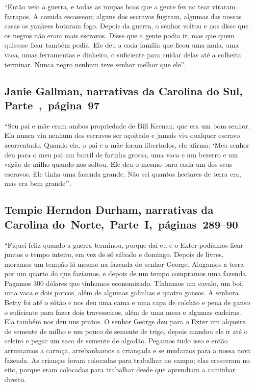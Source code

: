 ``Então veio a guerra, e todas as roupas boas que a gente fez no tear
viraram farrapos. A comida escasseou; alguns dos escravos fugiram,
algumas das nossas casas os yankees botaram fogo. Depois da guerra, o
senhor voltou e nos disse que os negros não eram mais escravos. Disse
que a gente podia ir, mas que quem quisesse ficar também podia. Ele deu
a cada família que ficou uma mula, uma vaca, umas ferramentas e
dinheiro, o suficiente para cuidar delas até a colheita terminar. Nunca
negro nenhum teve senhor melhor que ele''.

\subsection{Janie Gallman, narrativas da Carolina do Sul, Parte~,~página~97}
\label{ref97} 

``Seu pai e mãe eram ambos propriedade de Bill Keenan, que era um bom
senhor. Ela nunca viu nenhum dos escravos ser açoitado e jamais viu
qualquer escravo acorrentado. Quando ela, o pai e a mãe foram
libertados, ela afirma: `Meu senhor deu para o meu pai um barril de
farinha grossa, uma vaca e um bezerro e um vagão de milho quando nos
soltou. Ele deu o mesmo para cada um dos seus escravos. Ele tinha uma
fazenda grande. Não sei quantos hectares de terra era, mas era bem
grande'".

\subsection{Tempie Herndon Durham, narrativas da Carolina do~Norte,~Parte~I,~páginas~289--90}
\label{ref77}

``Fiquei feliz quando a guerra terminou, porque daí eu e o Exter
podíamos ficar juntos o tempo inteiro, em vez de só sábado e domingo.
Depois de livres, moramos um tempão lá mesmo na fazenda do senhor
George. Alugamos a terra por um quarto do que fazíamos, e depois de um
tempo compramos uma fazenda. Pagamos 300 dólares que tínhamos
economizado. Tínhamos um cavalo, um boi, uma vaca e dois porcos, além de
algumas galinhas e quatro gansos. A senhora Betty foi até o sótão e nos
deu uma cama e uma capa de colchão e pena de ganso o suficiente para
fazer dois travesseiros, além de uma mesa e algumas cadeiras. Ela também
nos deu uns pratos. O senhor George deu para o Exter um alqueire de
semente de milho e um pouco de semente de trigo, depois mandou ele ir
até o celeiro e pegar um saco de semente de algodão. Pegamos tudo isso e
então arrumamos a carroça, arrebanhamos a criançada e se mudamos para a
nossa nova fazenda. As crianças foram colocadas para trabalhar no campo;
elas cresceram no eito, porque eram colocadas para trabalhar desde que
aprendiam a caminhar direito.

